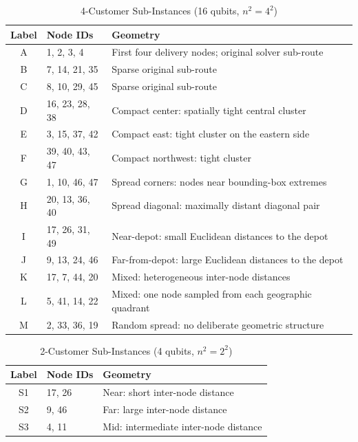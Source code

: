 \documentclass[a4paper]{report}
\begin{document}
{\begin{itemize}
\begin{itemize}
\begin{table}[h]
\centering
\begin{tabular}{cll}
\hline
\textbf{Label} & \textbf{Node IDs} & \textbf{Geometry} \\
\hline
A & 1, 2, 3, 4     & First four delivery nodes; original solver sub-route \\
B & 7, 14, 21, 35  & Sparse original sub-route \\
C & 8, 10, 29, 45  & Sparse original sub-route \\
D & 16, 23, 28, 38 & Compact center: spatially tight central cluster \\
E & 3, 15, 37, 42  & Compact east: tight cluster on the eastern side \\
F & 39, 40, 43, 47 & Compact northwest: tight cluster \\
G & 1, 10, 46, 47  & Spread corners: nodes near bounding-box extremes \\
H & 20, 13, 36, 40 & Spread diagonal: maximally distant diagonal pair \\
I & 17, 26, 31, 49 & Near-depot: small Euclidean distances to the depot \\
J & 9, 13, 24, 46  & Far-from-depot: large Euclidean distances to the depot \\
K & 17, 7, 44, 20  & Mixed: heterogeneous inter-node distances \\
L & 5, 41, 14, 22  & Mixed: one node sampled from each geographic quadrant \\
M & 2, 33, 36, 19  & Random spread: no deliberate geometric structure \\
\hline
\end{tabular}
\caption{4-Customer Sub-Instances (16 qubits, $n^2 = 4^2$)}
\label{tab:instances-4cust}
\end{table}

\begin{table}[h]
\centering
\begin{tabular}{cll}
\hline
\textbf{Label} & \textbf{Node IDs} & \textbf{Geometry} \\
\hline
S1 & 17, 26 & Near: short inter-node distance \\
S2 & 9, 46  & Far: large inter-node distance \\
S3 & 4, 11  & Mid: intermediate inter-node distance \\
\hline
\end{tabular}
\caption{2-Customer Sub-Instances (4 qubits, $n^2 = 2^2$)}
\label{tab:instances-2cust}
\end{table}


\end{itemize}
\end{itemize}}
\end{document}
